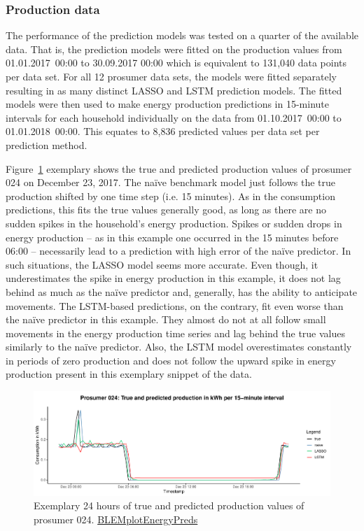 \subsubsection{Production data}

The performance of the prediction models was tested on a quarter of the available data. That is, the prediction models were fitted on the production values from 01.01.2017~00:00 to 30.09.2017 00:00 which is equivalent to 131,040 data points per data set. For all 12 prosumer data sets, the models were fitted separately resulting in as many distinct LASSO and LSTM prediction models. The fitted models were then used to make energy production predictions in 15-minute intervals for each household individually on the data from 01.10.2017~00:00 to 01.01.2018~00:00. This equates to 8,836 predicted values per data set per prediction method.

Figure~\ref{Fig:glimpse_predprod} exemplary shows the true and predicted production values of prosumer 024 on December 23, 2017. The na\"ive benchmark model just follows the true production shifted by one time step (i.e. 15 minutes). As in the consumption predictions, this fits the true values generally good, as long as there are no sudden spikes in the household's energy production. Spikes or sudden drops in energy production -- as in this example one occurred in the 15 minutes before 06:00 -- necessarily lead to a prediction with high error of the na\"ive predictor. In such situations, the LASSO model seems more accurate. Even though, it underestimates the spike in energy production in this example, it does not lag behind as much as the na\"ive predictor and, generally, has the ability to anticipate movements. The LSTM-based predictions, on the contrary, fit even worse than the na\"ive predictor in this example. They almost do not at all follow small movements in the energy production time series and lag behind the true values similarly to the na\"ive predictor. Also, the LSTM model overestimates constantly in periods of zero production and does not follow the upward spike in energy production present in this exemplary snippet of the data.
%
\begin{figure}[htbp]
    \centering
    \includegraphics[width=\textwidth]{thesis/graphs/evaluation/p024_pred_prod.pdf}
    \caption[Exemplary 24 hours of true and predicted production values]{Exemplary 24 hours of true and predicted production values of prosumer 024. \quantnet\href{}{BLEMplotEnergyPreds}}
    \label{Fig:glimpse_predprod}
\end{figure}
%

